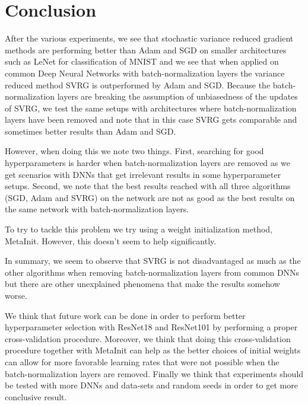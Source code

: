 \documentclass[a4paper,11pt,oneside]{report}
\begin{document}
\chapter{Conclusion}

After the various experiments, we see that stochastic variance reduced gradient methods are performing better than Adam and SGD on smaller architectures such as LeNet for classification of MNIST and we see that when applied on common Deep Neural Networks with batch-normalization layers the variance reduced method SVRG is outperformed by Adam and SGD.
Because the batch-normalization layers are breaking the assumption of unbiasedness of the updates of SVRG, we test the same setups with architectures where batch-normalization layers have been removed and note that in this case SVRG gets comparable and sometimes better results than Adam and SGD. 

However, when doing this we note two things. First, searching for good hyperparameters is harder when batch-normalization layers are removed as we get scenarios with DNNs that get irrelevant results in some hyperparameter setups. 
Second, we note that the best results reached with all three algorithms (SGD, Adam and SVRG) on the network are not as good as the best results on the same network with batch-normalization layers.

To try to tackle this problem we try using a weight initialization method, MetaInit. However, this doesn't seem to help significantly. 

In summary, we seem to observe that SVRG is not disadvantaged as much as the other algorithms when removing batch-normalization layers from common DNNs but there are other unexplained phenomena that make the results somehow worse.

We think that future work can be done in order to perform better hyperparameter selection with ResNet18 and ResNet101 by performing a proper cross-validation procedure. Moreover, we think that doing this cross-validation procedure together with MetaInit can help as the better choices of initial weights can allow for more favorable learning rates that were not possible when the batch-normalization layers are removed. Finally we think that experiments should be tested with more DNNs and data-sets and random seeds in order to get more conclusive result. 

\makeacks


\cleardoublepage
{}
{}
\printbibliography
\end{document}
